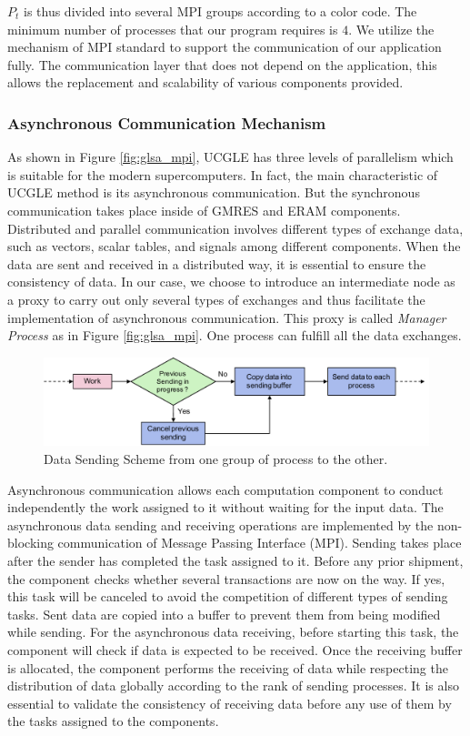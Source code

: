$P_t$ is thus divided into several MPI groups according to a color code. The minimum number of processes that our program requires is $4$. We utilize the mechanism of MPI standard to support the communication of our application fully. The communication layer that does not depend on the application, this allows the replacement and scalability of various components provided.

\subsubsection{Asynchronous Communication Mechanism}

As shown in Figure \ref{fig:glsa_mpi}, UCGLE has three levels of parallelism which is suitable for the modern supercomputers. In fact, the main characteristic of UCGLE method is its asynchronous communication. But the synchronous communication takes place inside of GMRES and ERAM components. Distributed and parallel communication involves different types of exchange data, such as vectors, scalar tables, and signals among different components. When the data are sent and received in a distributed way, it is essential to ensure the consistency of data. In our case, we choose to introduce an intermediate node as a proxy to carry out only several types of exchanges and thus facilitate the implementation of asynchronous communication. This proxy is called \textit{Manager Process} as in Figure \ref{fig:glsa_mpi}. One process can fulfill all the data exchanges.

\begin{figure}[t]
	\centering
	\includegraphics[width=6.2in]{fig/send.pdf}
	\caption{Data Sending Scheme from one group of process to the other.}
	\label{fig:send}
\end{figure}

Asynchronous communication allows each computation component to conduct independently the work assigned to it without waiting for the input data. The asynchronous data sending and receiving operations are implemented by the non-blocking communication of Message Passing Interface (MPI). Sending takes place after the sender has completed the task assigned to it. Before any prior shipment, the component checks whether several transactions are now on the way. If yes, this task will be canceled to avoid the competition of different types of sending tasks. Sent data are copied into a buffer to prevent them from being modified while sending. For the asynchronous data receiving, before starting this task, the component will check if data is expected to be received. Once the receiving buffer is allocated, the component performs the receiving of data while respecting the distribution of data globally according to the rank of sending processes. It is also essential to validate the consistency of receiving data before any use of them by the tasks assigned to the components.


